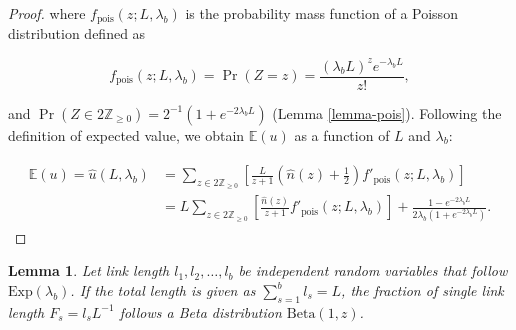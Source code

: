 \documentclass[11pt, class=article, crop=false]{standalone}
\newtheorem{lemma}{Lemma}[subsection]
\theoremstyle{definition}
\begin{document}
\begin{proof}
where $f_{\text{pois}}(z; L, \lambda_b)$ is the probability mass function of a Poisson distribution defined as

\begin{equation}
    f_{\text{pois}}(z; L, \lambda_b) = \Pr(Z = z) = \frac{(\lambda_b L)^{z} e^{-\lambda_b L}}{z!},
\end{equation}

and $\Pr(Z \in 2\mathbb{Z}_{\ge 0}) = 2^{-1}(1 + e^{- 2 \lambda_b L})$ (Lemma \ref{lemma-pois}). 
Following the definition of expected value, we obtain $\mathbb{E}(u)$ as a function of $L$ and $\lambda_b$:

\begin{align}
    \begin{split}
        \mathbb{E}(u) = \hat{u}(L, \lambda_b) 
                    &= \sum_{z \in 2\mathbb{Z}_{\ge 0}} \left[ \frac{L}{z + 1} \left(\hat{n}(z) + \frac{1}{2}\right) f'_{\text{pois}}(z; L, \lambda_b) \right]\\
                    &= L \sum_{z \in 2\mathbb{Z}_{\ge 0}} \left[ \frac{\hat{n}(z)}{z + 1} f'_{\text{pois}}(z; L, \lambda_b)\right] + 
                    \frac{1 - e^{-2 \lambda_b L}}{2 \lambda_b (1 + e^{-2 \lambda_b L})}.
    \end{split}
\end{align}
\end{proof}

\newpage

\begin{lemma}
\label{lemma-f}
Let link length $l_1, l_2, \ldots, l_b$ be independent random variables that follow $\mbox{Exp}(\lambda_b)$.
If the total length is given as $\sum_{s=1}^b l_s = L$, the fraction of single link length $F_s = l_s L^{-1}$ follows a Beta distribution $\mbox{Beta}(1, z)$.
\end{lemma}
\end{document}
